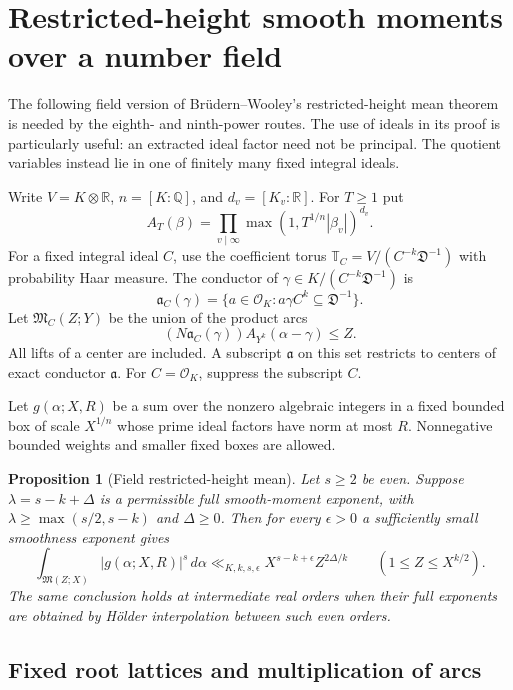 \documentclass[11pt,reqno]{amsart}
\numberwithin{equation}{section}
\newtheorem{proposition}[theorem]{Proposition}
\theoremstyle{definition}
\begin{document}
\section{Restricted-height smooth moments over a number field}
\label{sec:restricted-field}

The following field version of Br\"udern--Wooley's restricted-height
mean theorem is needed by the eighth- and ninth-power routes.  The use of
ideals in its proof is particularly useful: an extracted ideal factor
need not be principal.  The quotient variables instead lie in one of
finitely many fixed integral ideals.

Write $V=K\otimes\mathbb R$, $n=[K:\mathbb Q]$, and $d_v=[K_v:\mathbb R]$.
For $T\ge1$ put
\[
 A_T(\beta)=\prod_{v\mid\infty}
                 \max(1,T^{1/n}|\beta_v|)^{d_v}.
\]
For a fixed integral ideal $C$, use the coefficient torus
$\mathbb T_C=V/(C^{-k}\mathfrak D^{-1})$ with probability Haar measure.
The conductor of $\gamma\in K/(C^{-k}\mathfrak D^{-1})$ is
\[
 \mathfrak a_C(\gamma)
       =\{a\in\mathcal O_K:a\gamma C^k\subseteq\mathfrak D^{-1}\}.
\]
Let $\mathfrak M_C(Z;Y)$ be the union of the product arcs
\[
 (N\mathfrak a_C(\gamma)) A_{Y^k}(\alpha-\gamma)\le Z.
\]
All lifts of a center are included.  A subscript $\mathfrak a$ on this
set restricts to centers of exact conductor $\mathfrak a$.
For $C=\mathcal O_K$, suppress the subscript $C$.

Let $g(\alpha;X,R)$ be a sum over the nonzero algebraic integers in a fixed
bounded box of scale $X^{1/n}$ whose prime ideal factors have norm at most
$R$.  Nonnegative bounded weights and smaller fixed boxes are allowed.

\begin{proposition}[Field restricted-height mean]
\label{prop:restricted-field}
Let $s\ge2$ be even.  Suppose $\lambda=s-k+\Delta$ is a permissible
full smooth-moment exponent, with
$\lambda\ge\max(s/2,s-k)$ and $\Delta\ge0$.  Then for every
$\epsilon>0$ a sufficiently small smoothness exponent gives
\[
 \int_{\mathfrak M(Z;X)}|g(\alpha;X,R)|^s\,d\alpha
       \ll_{K,k,s,\epsilon} X^{s-k+\epsilon}Z^{2\Delta/k}
       \qquad(1\le Z\le X^{k/2}).
\]
The same conclusion holds at intermediate real orders when their full
exponents are obtained by H\"older interpolation between such even orders.
\end{proposition}

\subsection{Fixed root lattices and multiplication of arcs}
\end{document}
